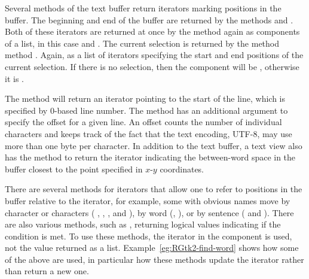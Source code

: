 Several methods of the text buffer return iterators marking positions
in the buffer.  The beginning and end of the buffer are returned by
the methods  and
. Both of these iterators are returned
at once by the method  again as
components of a list, in this case  and .  The
current selection is returned by the method method
. Again, as a list of
iterators specifying the start and end positions of the current
selection. If there is no selection, then the component 
will be , otherwise it is .

The method  will return an
iterator pointing to the start of the line, which is specified by
$0$-based line number. The method
 has an additional argument
to specify the offset for a given line. An offset counts the number of
individual characters and keeps track of the fact that the text
encoding, UTF-8, may use more than one byte per character.  In
addition to the text buffer, a text view also has the method
 to return the iterator
indicating the between-word space in the buffer closest to the point
specified in $x$-$y$ coordinates.

There are several methods for iterators that allow one to refer to
positions in the buffer relative to the iterator, for example, some
with obvious names  move by character or characters (
, ,
, and
),  by word (,
), or by sentence
( and
).  There are also various methods,
such as , returning logical values
indicating if the condition is met.
To use these methods, the iterator in the
 component is used, not the value returned as a
list. Example~\ref{eg:RGtk2-find-word} shows how some of the above are
used, in particular how these methods update the iterator rather than
return a new one.

